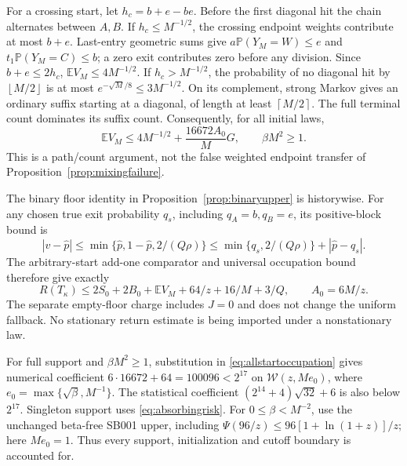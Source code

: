 \documentclass[11pt,letterpaper]{article}
\theoremstyle{definition}\newtheorem{definition}[theorem]{Definition}
\theoremstyle{remark}\newtheorem{remark}[theorem]{Remark}
\newcommand{\E}{\mathbb{E}}
\newcommand{\Prob}{\mathbb{P}}
\newcommand{\floor}[1]{\left\lfloor #1\right\rfloor}
\newcommand{\ceil}[1]{\left\lceil #1\right\rceil}
\begin{document}
For a crossing start, let $h_c=b+e-be$. Before the first diagonal hit the chain alternates between $A,B$. If $h_c\le M^{-1/2}$, the crossing endpoint weights contribute at most $b+e$. Last-entry geometric sums give
$a\Prob(Y_M=W)\le e$ and $t_1\Prob(Y_M=C)\le b$; a zero exit contributes zero before any division. Since $b+e\le2h_c$,
$\E V_M\le4M^{-1/2}$.
If $h_c>M^{-1/2}$, the probability of no diagonal hit by $\floor{M/2}$ is at most
$e^{-\sqrt M/8}\le3M^{-1/2}$.
On its complement, strong Markov gives an ordinary suffix starting at a diagonal, of length at least $\ceil{M/2}$. The full terminal count dominates its suffix count. Consequently, for all initial laws,
\begin{equation}\label{eq:allstartoccupation}
 \E V_M\le4M^{-1/2}+\frac{16672A_0}{M}G,
 \qquad \beta M^2\ge1.
\end{equation}
This is a path/count argument, not the false weighted endpoint transfer of Proposition~\ref{prop:mixingfailure}.

The binary floor identity in Proposition~\ref{prop:binaryupper} is historywise. For any chosen true exit probability $q_s$, including $q_A=b,q_B=e$, its positive-block bound is
\[
 |v-\widehat p|\le\min\{\widehat p,1-\widehat p,2/(Q\rho)\}
 \le\min\{q_s,2/(Q\rho)\}+|\widehat p-q_s|.
\]
The arbitrary-start add-one comparator and universal occupation bound therefore give exactly
\begin{equation}\label{eq:allstartdecoder}
 R(T_\kappa)\le
 2S_0+2B_0+\E V_M+64/z+16/M+3/Q,\qquad A_0=6M/z.
\end{equation}
The separate empty-floor charge includes $J=0$ and does not change the uniform fallback. No stationary return estimate is being imported under a nonstationary law.

For full support and $\beta M^2\ge1$, substitution in \eqref{eq:allstartoccupation} gives numerical coefficient
$6\cdot16672+64=100096<2^{17}$
on $\mathcal W(z,Me_0)$, where $e_0=\max\{\sqrt\beta,M^{-1}\}$. The statistical coefficient
$(2^{14}+4)\sqrt{32}+6$ is also below $2^{17}$.
Singleton support uses \eqref{eq:absorbingrisk}. For $0\le\beta<M^{-2}$, use the unchanged beta-free SB001 upper, including $\Psi(96/z)\le96[1+\ln(1+z)]/z$; here $Me_0=1$.
Thus every support, initialization and cutoff boundary is accounted for.
\end{document}
